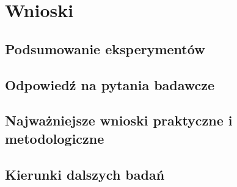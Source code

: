 \chapter{Wnioski}
\section{Podsumowanie eksperymentów}
\section{Odpowiedź na pytania badawcze}
\section{Najważniejsze wnioski praktyczne i metodologiczne}
\section{Kierunki dalszych badań}